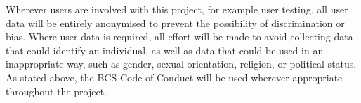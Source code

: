 %

Wherever users are involved with this project, for example user testing, all user data will be entirely anonymised to prevent the possibility of discrimination or bias.
Where user data is required, all effort will be made to avoid collecting data that could identify an individual, as well as data that could be used in an inappropriate way, such as gender, sexual orientation, religion, or political status.
As stated above, the BCS Code of Conduct will be used wherever appropriate throughout the project.
